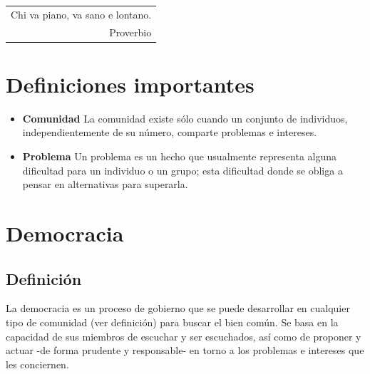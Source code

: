 \documentclass[10pt,letterpaper,oneside]{book}
\makeatletter
\newenvironment{myepigraph}
  {\par\hfill\itshape
   \begin{tabular}{@{}r@{\hspace{2em}}}} %
  {\end{tabular}\par\medskip}
\makeatother
\begin{document}
\begin{myepigraph}
Chi va piano, va sano e lontano.
\vspace{0.1cm}\\
Proverbio
\end{myepigraph}

\section*{Definiciones importantes}
\begin{itemize}

	\item {\bf Comunidad}	
La comunidad existe sólo cuando un conjunto de individuos, independientemente de su número, comparte problemas e intereses.
	
	\item {\bf Problema}
	Un problema es un hecho que usualmente representa alguna dificultad para un individuo o un grupo; esta dificultad donde se obliga a pensar en alternativas para superarla.
\end{itemize}

	\section{Democracia} 

		\subsection*{Definición}
La democracia es un proceso de gobierno que se puede desarrollar en cualquier tipo de comunidad (ver definición) para buscar el bien común. Se basa en la capacidad de sus miembros de escuchar y ser escuchados, así como de proponer y actuar -de forma prudente y responsable- en torno a los problemas e intereses que les conciernen.
	\vspace{-0.3cm}
\end{document}
